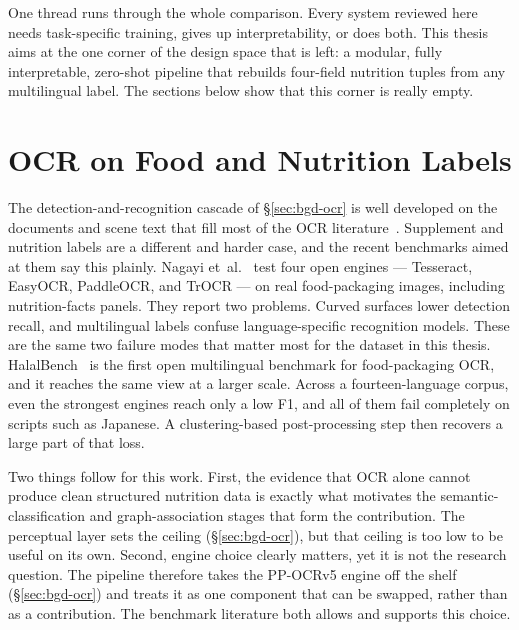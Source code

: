 One thread runs through the whole comparison. Every system reviewed here needs task-specific training, gives up interpretability, or does both. This thesis aims at the one corner of the design space that is left: a modular, fully interpretable, zero-shot pipeline that rebuilds four-field nutrition tuples from any multilingual label. The sections below show that this corner is really empty.

\section{OCR on Food and Nutrition Labels}\label{sec:rw-ocr}

The detection-and-recognition cascade of \S\ref{sec:bgd-ocr} is well developed on the documents and scene text that fill most of the OCR literature~\cite{long2021scene}. Supplement and nutrition labels are a different and harder case, and the recent benchmarks aimed at them say this plainly. Nagayi et~al.~\cite{nagayi2025foodocr} test four open engines --- Tesseract, EasyOCR, PaddleOCR, and TrOCR --- on real food-packaging images, including nutrition-facts panels. They report two problems. Curved surfaces lower detection recall, and multilingual labels confuse language-specific recognition models. These are the same two failure modes that matter most for the dataset in this thesis. HalalBench~\cite{arief2026halalbench} is the first open multilingual benchmark for food-packaging OCR, and it reaches the same view at a larger scale. Across a fourteen-language corpus, even the strongest engines reach only a low F1, and all of them fail completely on scripts such as Japanese. A clustering-based post-processing step then recovers a large part of that loss.

Two things follow for this work. First, the evidence that OCR alone cannot produce clean structured nutrition data is exactly what motivates the semantic-classification and graph-association stages that form the contribution. The perceptual layer sets the ceiling (\S\ref{sec:bgd-ocr}), but that ceiling is too low to be useful on its own. Second, engine choice clearly matters, yet it is not the research question. The pipeline therefore takes the PP-OCRv5 engine off the shelf (\S\ref{sec:bgd-ocr}) and treats it as one component that can be swapped, rather than as a contribution. The benchmark literature both allows and supports this choice.

